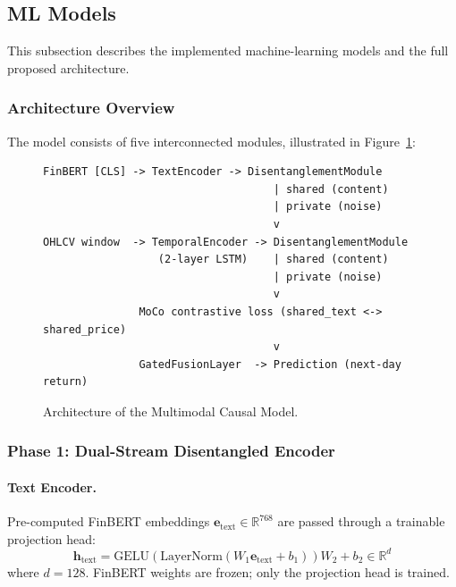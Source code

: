 \documentclass[12pt, a4paper]{article}
\begin{document}
\subsection{ML Models}
\label{sec:ml_models}

This subsection describes the implemented machine-learning models and the full proposed architecture.

\subsubsection{Architecture Overview}

The model consists of five interconnected modules, illustrated in Figure~\ref{fig:arch}:

\begin{figure}[htbp]
\centering
\begin{lstlisting}
FinBERT [CLS] -> TextEncoder -> DisentanglementModule
                                    | shared (content)
                                    | private (noise)
                                    v
OHLCV window  -> TemporalEncoder -> DisentanglementModule
                  (2-layer LSTM)    | shared (content)
                                    | private (noise)
                                    v
               MoCo contrastive loss (shared_text <-> shared_price)
                                    v
               GatedFusionLayer  -> Prediction (next-day return)
\end{lstlisting}
\caption{Architecture of the Multimodal Causal Model.}
\label{fig:arch}
\end{figure}


\subsubsection{Phase 1: Dual-Stream Disentangled Encoder}

\paragraph{Text Encoder.}

Pre-computed FinBERT embeddings $\mathbf{e}_\text{text} \in \mathbb{R}^{768}$ are passed through a trainable projection head:
\[
    \mathbf{h}_\text{text} = \text{GELU}(\text{LayerNorm}(W_1 \mathbf{e}_\text{text} + b_1))W_2 + b_2 \in \mathbb{R}^{d}
\]
where $d = 128$. FinBERT weights are frozen; only the projection head is trained.
\end{document}
